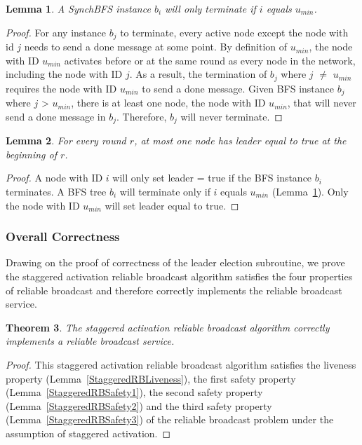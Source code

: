 \documentclass[english]{article}
\newtheorem{theorem}{Theorem}[section]
\newtheorem{lemma}[theorem]{Lemma}
\begin{document}
\begin{lemma}
\label{BFSTerminationStaggered}
  A SynchBFS instance $b_i$ will only terminate if $i$ equals $u_{min}$.
\end{lemma}
\begin{proof}
For any instance $b_j$ to terminate, every active node except the node with id $j$ needs to send a done message at some point. By definition of $u_{min}$, the node with ID $u_{min}$ activates before or at the same round as every node in the network, including the node with ID $j$. As a result, the termination of $b_j$ where $j$ $\neq $ $u_{min}$ requires the node with ID $u_{min}$ to send a done message. Given BFS instance $b_j$ where $j$ \textgreater $ $ $u_{min}$, there is at least one node, the node with ID $u_{min}$, that will never send a done message in $b_j$. Therefore, $b_j$ will never terminate.
\end{proof}


\begin{lemma}
\label{LESafetyStaggered}
For every round $r$, at most one node has leader equal to true at the beginning of $r$.
\end{lemma}
\begin{proof}
A node with ID $i$ will only set leader = true if the BFS instance $b_i$ terminates.
A BFS tree $b_i$ will terminate only if $i$ equals $u_{min}$ (Lemma~\ref{BFSTerminationStaggered}).
Only the node with ID $u_{min}$ will set leader equal to true. 
\end{proof}


\subsubsection{Overall Correctness}

Drawing on the proof of correctness of the leader election subroutine, we prove the staggered activation reliable broadcast algorithm satisfies the four properties of reliable broadcast and therefore correctly implements the reliable broadcast service.

\begin{theorem}
\label{StaggeredReliableBroadcast}
The staggered activation reliable broadcast algorithm correctly implements a reliable broadcast service.
\end{theorem}
\begin{proof}
This staggered activation reliable broadcast algorithm satisfies the liveness property (Lemma~\ref{StaggeredRBLiveness}), 
the first safety property (Lemma~\ref{StaggeredRBSafety1}),
the second safety property (Lemma~\ref{StaggeredRBSafety2}) and 
the third safety property (Lemma~\ref{StaggeredRBSafety3}) of the reliable broadcast problem under the assumption of staggered activation.
\end{proof}
\end{document}

